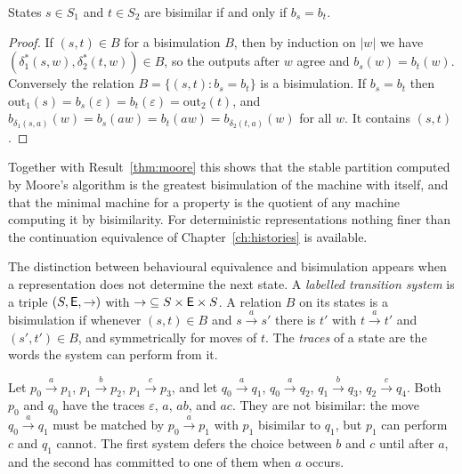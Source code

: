 \begin{established}\label{thm:bisim}
States $s\in S_1$ and $t\in S_2$ are bisimilar if and only if $b_s=b_t$.
\end{established}
\begin{proof}
If $(s,t)\in B$ for a bisimulation $B$, then by induction on $|w|$ we have $(\delta_1^{*}(s,w),\delta_2^{*}(t,w))\in B$, so the outputs after $w$ agree and $b_s(w)=b_t(w)$. Conversely the relation $B=\{(s,t):b_s=b_t\}$ is a bisimulation. If $b_s=b_t$ then $\mathrm{out}_1(s)=b_s(\varepsilon)=b_t(\varepsilon)=\mathrm{out}_2(t)$, and $b_{\delta_1(s,a)}(w)=b_s(aw)=b_t(aw)=b_{\delta_2(t,a)}(w)$ for all $w$. It contains $(s,t)$.
\end{proof}

Together with Result~\ref{thm:moore} this shows that the stable partition computed by Moore's algorithm is the greatest bisimulation of the machine with itself, and that the minimal machine for a property is the quotient of any machine computing it by bisimilarity. For deterministic representations nothing finer than the continuation equivalence of Chapter~\ref{ch:histories} is available.

The distinction between behavioural equivalence and bisimulation appears when a representation does not determine the next state. A \emph{labelled transition system} is a triple $(S,\mathsf{E},{\to})$ with ${\to}\subseteq S\times\mathsf{E}\times S$. A relation $B$ on its states is a bisimulation if whenever $(s,t)\in B$ and $s\xrightarrow{a}s'$ there is $t'$ with $t\xrightarrow{a}t'$ and $(s',t')\in B$, and symmetrically for moves of $t$. The \emph{traces} of a state are the words the system can perform from it.

\begin{example}\label{ex:bisim-nondet}
Let $p_0\xrightarrow{a}p_1$, $p_1\xrightarrow{b}p_2$, $p_1\xrightarrow{c}p_3$, and let $q_0\xrightarrow{a}q_1$, $q_0\xrightarrow{a}q_2$, $q_1\xrightarrow{b}q_3$, $q_2\xrightarrow{c}q_4$. Both $p_0$ and $q_0$ have the traces $\varepsilon$, $a$, $ab$, and $ac$. They are not bisimilar: the move $q_0\xrightarrow{a}q_1$ must be matched by $p_0\xrightarrow{a}p_1$ with $p_1$ bisimilar to $q_1$, but $p_1$ can perform $c$ and $q_1$ cannot. The first system defers the choice between $b$ and $c$ until after $a$, and the second has committed to one of them when $a$ occurs.
\end{example}

